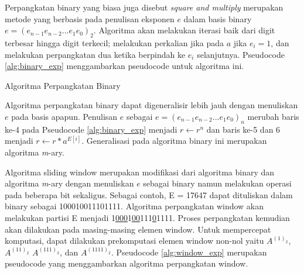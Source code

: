         Perpangkatan binary yang biasa juga disebut \textit{square and multiply} merupakan metode yang berbasis pada penulisan eksponen $e$ dalam basis binary $e=(e_{n-1} e_{n-2} ... e_{1} e_{0})_2$. Algoritma akan melakukan iterasi baik dari digit terbesar hingga digit terkecil; melakukan perkalian jika pada $a$ jika $e_{i} = 1$, dan melakukan perpangkatan dua ketika berpindah ke $e_{i}$ selanjutnya. Pseudocode \ref{alg:binary_exp} menggambarkan pseudocode untuk algoritma ini.

        \begin{algorithm}
          \caption{Algoritma Perpangkatan Binary}
          \label{alg:binary_exp}
          \begin{algorithmic}[1]
            \Statex

                \EndIf
            \EndFor
            \State {}
            \EndFunction
          \end{algorithmic}
        \end{algorithm}

        Algoritma perpangkatan binary dapat digeneralisir lebih jauh dengan menuliskan $e$ pada basis apapun. Penulisan $e$ sebagai $e=(e_{n-1} e_{n-2} ... e_{1} e_{0})_n$ merubah baris ke-4 pada Pseudocode \ref{alg:binary_exp} menjadi $r \gets r^{n}$ dan baris ke-5 dan 6 menjadi $r \gets r*a^{E[i]}$. Generalisasi pada algoritma binary ini merupakan algoritma \textit{m}-ary.

        Algoritma sliding window merupakan modifikasi dari algoritma binary dan algoritma \textit{m}-ary dengan menuliskan $e$ sebagai binary namun melakukan operasi pada beberapa bit sekaligus. Sebagai contoh, E =  17647 dapat dituliskan dalam binary sebagai 100010011101111. Algoritma perpangkatan window akan melakukan partisi E menjadi 1\underline{000}1\underline{00}111\underline{0}1111. Proses perpangkatan kemudian akan dilakukan pada masing-masing elemen window. Untuk mempercepat komputasi, dapat dilakukan prekomputasi elemen window non-nol yaitu $A^{(1)_2}$, $A^{(11)_2}$ $A^{(111)_2}$, dan $A^{(1111)_2}$. Pseudocode \ref{alg:window_exp} merupakan pseudocode yang menggambarkan algoritma perpangkatan window.

